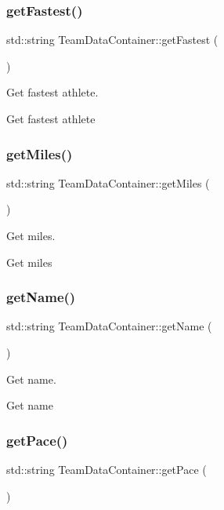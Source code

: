 \subsubsection{\texorpdfstring{getFastest()}{getFastest()}}
{\footnotesize\ttfamily std\+::string Team\+Data\+Container\+::get\+Fastest (\begin{DoxyParamCaption}{ }\end{DoxyParamCaption})}



Get fastest athlete. 

Get fastest athlete \mbox{\label{classTeamDataContainer_a957dba1bc878b59ffb15c6aed6d02a75}} 
\subsubsection{\texorpdfstring{getMiles()}{getMiles()}}
{\footnotesize\ttfamily std\+::string Team\+Data\+Container\+::get\+Miles (\begin{DoxyParamCaption}{ }\end{DoxyParamCaption})}



Get miles. 

Get miles \mbox{\label{classTeamDataContainer_aed1b673750d8228deffc689462366d9f}} 
\subsubsection{\texorpdfstring{getName()}{getName()}}
{\footnotesize\ttfamily std\+::string Team\+Data\+Container\+::get\+Name (\begin{DoxyParamCaption}{ }\end{DoxyParamCaption})}



Get name. 

Get name \mbox{\label{classTeamDataContainer_a7dd8ccaf5098d02168c1862cf096af0a}} 
\subsubsection{\texorpdfstring{getPace()}{getPace()}}
{\footnotesize\ttfamily std\+::string Team\+Data\+Container\+::get\+Pace (\begin{DoxyParamCaption}{ }\end{DoxyParamCaption})}



